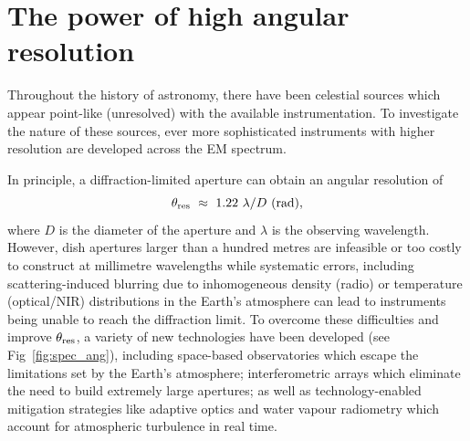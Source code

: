 \section{The power of high angular resolution}
Throughout the history of astronomy, there have been celestial sources which appear point-like (unresolved) with the available instrumentation. To investigate the nature of these sources, ever more sophisticated instruments with higher resolution are developed across the EM spectrum. 

In principle, a diffraction-limited aperture can obtain an angular resolution of
\begin{equation}\label{eq:ang_res}
 \theta_{\rm res}\ \approx \ 1.22\ \lambda / D\ {\rm (rad)},
\end{equation}
where $D$ is the diameter of the aperture and $\lambda$ is the observing wavelength. However, dish apertures larger than a hundred metres are infeasible or too costly to construct at millimetre wavelengths while systematic errors, including scattering-induced blurring due to inhomogeneous density (radio) or temperature (optical/NIR) distributions in the Earth's atmosphere can lead to instruments being unable to reach the diffraction limit. To overcome these difficulties and improve $\theta_{\rm res}$, a variety of new technologies have been developed (see Fig~\ref{fig:spec_ang}), including space-based observatories which escape the limitations set by the Earth's atmosphere; interferometric arrays which eliminate the need to build extremely large apertures; as well as technology-enabled mitigation strategies like adaptive optics and water vapour radiometry which account for atmospheric turbulence in real time. 


